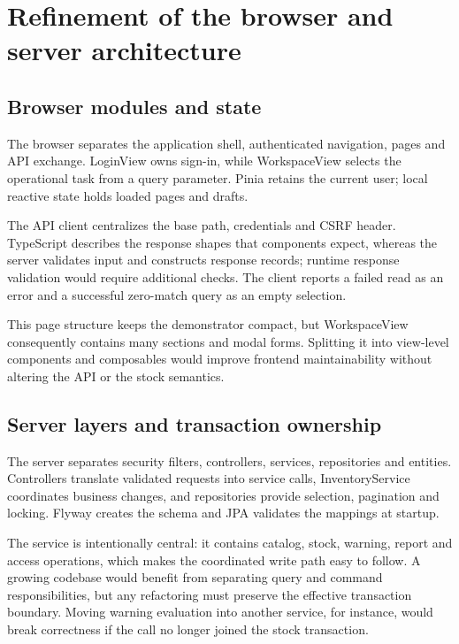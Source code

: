 \FloatBarrier

\section{Refinement of the browser and server architecture}

\subsection{Browser modules and state}

The browser separates the application shell, authenticated navigation, pages and API exchange. LoginView owns sign-in, while WorkspaceView selects the operational task from a query parameter. Pinia retains the current user; local reactive state holds loaded pages and drafts.


The API client centralizes the base path, credentials and CSRF header. TypeScript describes the response shapes that components expect, whereas the server validates input and constructs response records; runtime response validation would require additional checks. The client reports a failed read as an error and a successful zero-match query as an empty selection.


This page structure keeps the demonstrator compact, but WorkspaceView consequently contains many sections and modal forms. Splitting it into view-level components and composables would improve frontend maintainability without altering the API or the stock semantics.


\subsection{Server layers and transaction ownership}

The server separates security filters, controllers, services, repositories and entities. Controllers translate validated requests into service calls, InventoryService coordinates business changes, and repositories provide selection, pagination and locking. Flyway creates the schema and JPA validates the mappings at startup.


The service is intentionally central: it contains catalog, stock, warning, report and access operations, which makes the coordinated write path easy to follow. A growing codebase would benefit from separating query and command responsibilities, but any refactoring must preserve the effective transaction boundary. Moving warning evaluation into another service, for instance, would break correctness if the call no longer joined the stock transaction.



